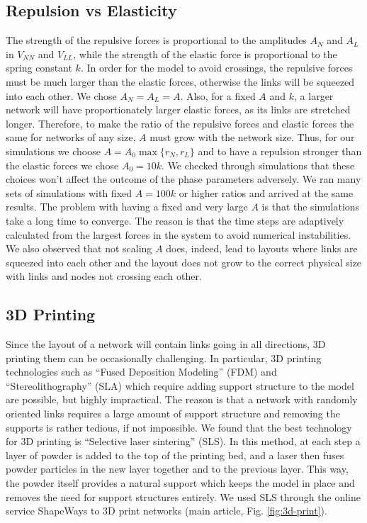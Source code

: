 \documentclass[endfloats,nofootinbib,preprint,floatfix,titlepage,superscriptaddress]{revtex4} %
\begin{document}
\subsection{Repulsion vs Elasticity}
The strength of the repulsive forces is proportional to the amplitudes $A_N$ and $A_L$ in $V_{NN}$ and $V_{LL}$, while the  strength of the elastic force is proportional to the spring constant $k$. 
In order for the model to avoid crossings, the repulsive forces must be  much larger than the elastic forces, otherwise the links will be squeezed into each other. 
We chose $A_N=A_L = A$.
Also, for a fixed $A$ and $k$, a larger network will have proportionately larger elastic forces, as its links are stretched longer. 
Therefore, to make the ratio of the repulsive forces and elastic forces the same for networks of any size, $A$ must grow with the network size. 
Thus, for our simulations we choose $A = A_0 \max\{r_N, r_L\}$ and to have a repulsion stronger than the elastic forces we chose $A_0 = 10 k$. 
We checked through simulations that these choices won't affect the outcome of the phase parameters adversely. 
We ran many sets of simulations with fixed $A = 100k $ or higher ratios and arrived at the same results. 
The problem with having a fixed and very large $A$ is that the simulations take a long time to converge. 
The reason is that the time steps are adaptively calculated from the largest forces in the system to avoid numerical instabilities. 
We also observed that not scaling $A$ does, indeed, lead to layouts where links are squeezed into each other and the layout does not grow to the correct physical size with links and nodes not crossing each other.  

\subsection{3D Printing}
Since the layout of a network will contain links going in all directions, 3D printing them can be occasionally challenging. 
In particular, 3D printing technologies such as ``Fused Deposition Modeling'' (FDM) and ``Stereolithography'' (SLA) which require adding support structure to the model are possible, but highly impractical. 
The reason is that a network with randomly oriented links requires a large amount of support structure and removing the supports is rather tedious, if not impossible. 
We found that the best technology for 3D printing is ``Selective laser sintering'' (SLS). 
In this method, at each step a layer of powder is added to the top of the printing bed, and a laser then fuses powder particles in the new layer together and to the previous layer. 
This way, the powder itself provides a natural support which keeps the model in place and removes the need for support structures entirely.
We used SLS through the online service ShapeWays to 3D print networks (main article, Fig. \ref{fig:3d-print}). 
\end{document}
